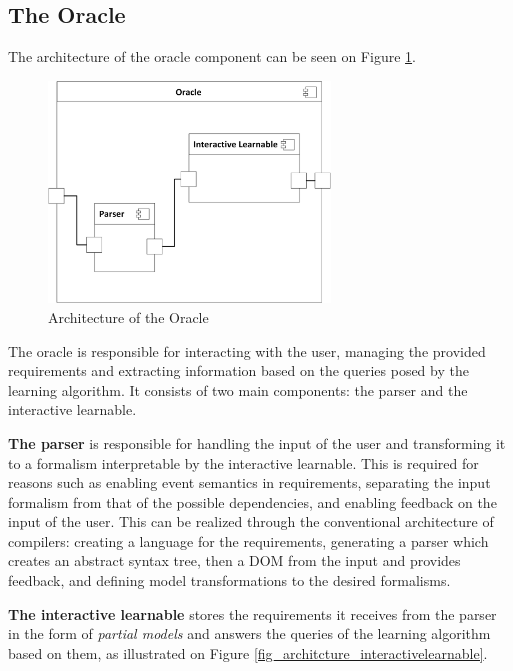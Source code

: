 \subsection{The Oracle} \label{subs_oracle}

The architecture of the oracle component can be seen on Figure \ref{fig_architcture_oracle}.

\begin{figure}[!ht] 
	\centering
		\includegraphics[width=75mm, keepaspectratio]{figures/architecture_oracle.png}
	\caption{Architecture of the Oracle} 
	\label{fig_architcture_oracle}
\end{figure}

The oracle is responsible for interacting with the user, managing the provided requirements and extracting information based on the queries posed by the learning algorithm. It consists of two main components: the parser and the interactive learnable.

\textbf{The parser} is responsible for handling the input of the user and transforming it to a formalism interpretable by the interactive learnable. This is required for reasons such as enabling event semantics in requirements, separating the input formalism from that of the possible dependencies, and enabling feedback on the input of the user. This can be realized through the conventional architecture of compilers: creating a language for the requirements, generating a parser which creates an abstract syntax tree, then a DOM from the input and provides feedback, and defining model transformations to the desired formalisms.

\textbf{The interactive learnable} stores the requirements it receives from the parser in the form of \textit{partial models} and answers the queries of the learning algorithm based on them, as illustrated on Figure \ref{fig_architcture_interactivelearnable}.

